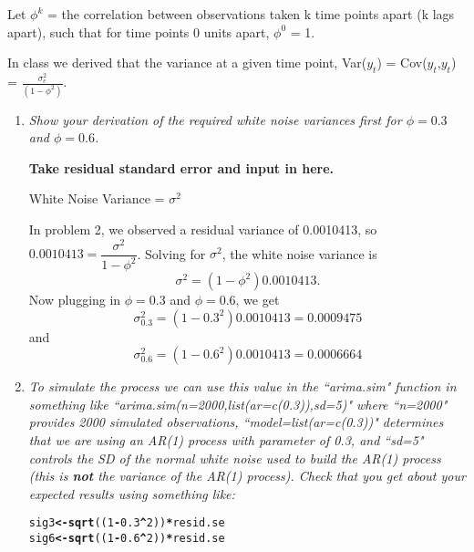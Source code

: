 \documentclass[11pt]{article}\usepackage[]{graphicx}\usepackage[]{color}
\makeatletter
\newcommand{\hlnum}[1]{\textcolor[rgb]{0,0,0}{#1}}%
\newcommand{\hlopt}[1]{\textcolor[rgb]{0,0,0}{\textbf{#1}}}%
\newcommand{\hlstd}[1]{\textcolor[rgb]{0,0,0}{#1}}%
\newcommand{\hlkwb}[1]{\textcolor[rgb]{0,0,0}{\textbf{#1}}}%
\newcommand{\hlkwd}[1]{\textcolor[rgb]{0,0,0}{\textbf{#1}}}%
\newenvironment{kframe}{%
 \def\at@end@of@kframe{}%
 \ifinner\ifhmode%
  \def\at@end@of@kframe{\end{minipage}}%
  \begin{minipage}{\columnwidth}%
 \fi\fi%
 \def\FrameCommand##1{\hskip\@totalleftmargin \hskip-\fboxsep
 \colorbox{shadecolor}{##1}\hskip-\fboxsep
     \hskip-\linewidth \hskip-\@totalleftmargin \hskip\columnwidth}%
 \MakeFramed {\advance\hsize-\width
   \@totalleftmargin\z@ \linewidth\hsize
   \@setminipage}}%
 {\par\unskip\endMakeFramed%
 \at@end@of@kframe}
\newenvironment{knitrout}{}{} %
\makeatother
\begin{document}
\begin{enumerate}
Let $\phi^{k}$ = the correlation between observations taken k time points apart (k lags apart), such that for time points 0 units apart, $\phi^{0}$ = 1.

In class we derived that the variance at a given time point, Var($y_{t}$) = Cov($y_{t}$,$y_{t}$) = $\frac{\sigma^2_{e}}{(1-\phi^2)}$.


\begin{enumerate}
\item%
{\it Show your derivation of the required white noise variances first for $\phi=0.3$ and $\phi=0.6$.}

{\bf Take residual standard error and input in here.}

White Noise Variance = $\sigma^2$

In problem 2, we observed a residual variance of 0.0010413, so $0.0010413 = \dfrac{\sigma^2}{1-\phi^2}$. Solving for $\sigma^2$, the white noise variance is
$$
\sigma^2 = (1-\phi^2) 0.0010413.
$$
Now plugging in $\phi=0.3$ and $\phi=0.6$, we get
$$\sigma^2_{0.3} = (1-0.3^2) 0.0010413 = 0.0009475$$
and
$$\sigma^2_{0.6} = (1-0.6^2) 0.0010413 = 0.0006664$$

\item%
{\it To simulate the process we can use this value in the ``arima.sim" function in something like ``arima.sim(n=2000,list(ar=c(0.3)),sd=5)" where ``n=2000" provides 2000 simulated observations, ``model=list(ar=c(0.3))" determines that we are using an AR(1) process with parameter of 0.3, and ``sd=5" controls the SD of the normal white noise used to build the AR(1) process (this is {\bf not} the variance of the AR(1) process). Check that you get about your expected results using something like:}


\begin{knitrout}\footnotesize
{}\color{fgcolor}\begin{kframe}
\begin{alltt}
\hlstd{sig3} \hlkwb{<-} \hlkwd{sqrt}\hlstd{((}\hlnum{1}\hlopt{-}\hlnum{0.3}\hlopt{^}\hlnum{2}\hlstd{))} \hlopt{*} \hlstd{resid.se}
\hlstd{sig6} \hlkwb{<-} \hlkwd{sqrt}\hlstd{((}\hlnum{1}\hlopt{-}\hlnum{0.6}\hlopt{^}\hlnum{2}\hlstd{))} \hlopt{*} \hlstd{resid.se}


\end{alltt}
\end{kframe}
\end{knitrout}
\end{enumerate}
\end{enumerate}
\end{document}
